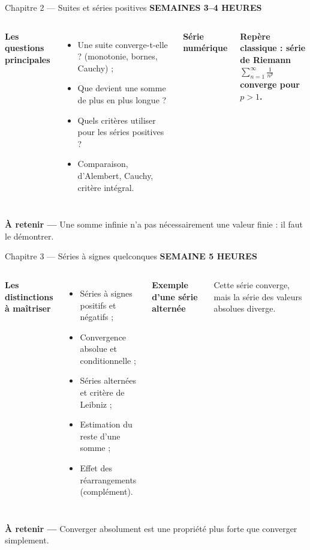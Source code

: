 \documentclass[aspectratio=169,10pt]{beamer}
\newcommand{\meta}[1]{{\small\bfseries\color{turquoise} #1}\par\vspace{0.07cm}}
\newcommand{\formule}[2]{\begin{tcolorbox}[colback=pale,colframe=pale]
  {\small\bfseries\color{bleu}#1}\par\vspace{0.13cm}
  \centering {\large\color{nuit}$\displaystyle #2$}\par
\end{tcolorbox}}
\newcommand{\takeaway}[1]{\vfill\begin{tcolorbox}[colback=palevert,colframe=palevert]
{\small\color{encre}\textbf{À retenir —} #1}\end{tcolorbox}}
\newcommand{\smalllist}{\setlength{\itemsep}{0.04cm}\setlength{\parskip}{0pt}}
\begin{document}
\begin{frame}{Chapitre 2 — Suites et séries positives}
\meta{SEMAINES 3–4 \quad\textbullet{} HEURES}
\begin{columns}[T,onlytextwidth]
{\bfseries\color{nuit}Les questions principales}
\begin{itemize}\smalllist
\item Une suite converge-t-elle ? (monotonie, bornes, Cauchy) ;
\item Que devient une somme de plus en plus longue ?
\item Quels critères utiliser pour les séries positives ?
\item Comparaison, d'Alembert, Cauchy, critère intégral.
\end{itemize}
\formule{Série numérique}{\sum_{n=1}^{\infty}u_n}
\begin{tcolorbox}[colback=paleorange,colframe=paleorange]
\small\bfseries\color{nuit}Repère classique : série de Riemann\\[3pt]
\centering $\displaystyle\sum_{n=1}^\infty\frac1{n^p}$ converge pour $p>1$.
\end{tcolorbox}
\end{columns}
\takeaway{Une somme infinie n'a pas nécessairement une valeur finie : il faut le démontrer.}
\end{frame}

\begin{frame}{Chapitre 3 — Séries à signes quelconques}
\meta{SEMAINE 5 \quad\textbullet{} HEURES}
\begin{columns}[T,onlytextwidth]
{\bfseries\color{nuit}Les distinctions à maîtriser}
\begin{itemize}\smalllist
\item Séries à signes positifs et négatifs ;
\item Convergence absolue et conditionnelle ;
\item Séries alternées et critère de Leibniz ;
\item Estimation du reste d'une somme ;
\item Effet des réarrangements (complément).
\end{itemize}
\formule{Exemple d'une série alternée}{1-\frac12+\frac13-\frac14+\cdots}
\begin{tcolorbox}[colback=palevert,colframe=palevert]
\small Cette série converge, mais la série des valeurs absolues diverge.
\end{tcolorbox}
\end{columns}
\takeaway{Converger absolument est une propriété plus forte que converger simplement.}
\end{frame}
\end{document}
